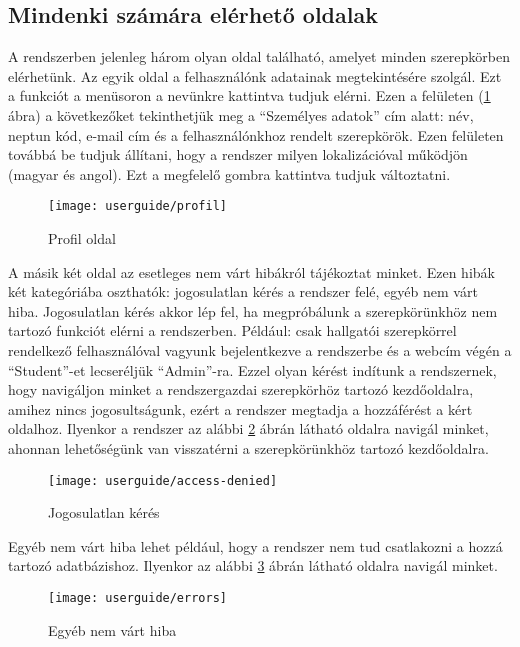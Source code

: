 \subsection{Mindenki számára elérhető oldalak}
\label{step:mindenkinek-elerheto-oldal}
A rendszerben jelenleg három olyan oldal található, amelyet minden szerepkörben elérhetünk. Az egyik oldal a felhasználónk adatainak megtekintésére szolgál. Ezt a funkciót a menüsoron a nevünkre kattintva tudjuk elérni. Ezen a felületen (\ref{fig:profile} ábra) a következőket tekinthetjük meg a ``Személyes adatok'' cím alatt: név, neptun kód, e-mail cím és a felhasználónkhoz rendelt szerepkörök. Ezen felületen továbbá be tudjuk állítani, hogy a rendszer milyen lokalizációval működjön (magyar és angol). Ezt a megfelelő gombra kattintva tudjuk változtatni.
\begin{figure}[H]
	\centering
	\texttt{[image: userguide/profil]}
	\caption{Profil oldal}
	\label{fig:profile}
\end{figure}
A másik két oldal az esetleges nem várt hibákról tájékoztat minket. Ezen hibák két kategóriába oszthatók: jogosulatlan kérés a rendszer felé, egyéb nem várt hiba. Jogosulatlan kérés akkor lép fel, ha megpróbálunk a szerepkörünkhöz nem tartozó funkciót elérni a rendszerben. Például: csak hallgatói szerepkörrel rendelkező felhasználóval vagyunk bejelentkezve a rendszerbe és a webcím végén a ``Student''-et lecseréljük ``Admin''-ra. Ezzel olyan kérést indítunk a rendszernek, hogy navigáljon minket a rendszergazdai szerepkörhöz tartozó kezdőoldalra, amihez nincs jogosultságunk, ezért a rendszer megtadja a hozzáférést a kért oldalhoz. Ilyenkor a rendszer az alábbi \ref{fig:access-denied} ábrán látható oldalra navigál minket, ahonnan lehetőségünk van visszatérni a szerepkörünkhöz tartozó kezdőoldalra.
\begin{figure}[H]
	\centering
	\texttt{[image: userguide/access-denied]}
	\caption{Jogosulatlan kérés}
	\label{fig:access-denied}
\end{figure}
Egyéb nem várt hiba lehet például, hogy a rendszer nem tud csatlakozni a hozzá tartozó adatbázishoz. Ilyenkor az alábbi \ref{fig:errors} ábrán látható oldalra navigál minket.
\begin{figure}[H]
	\centering
	\texttt{[image: userguide/errors]}
	\caption{Egyéb nem várt hiba}
	\label{fig:errors}
\end{figure}